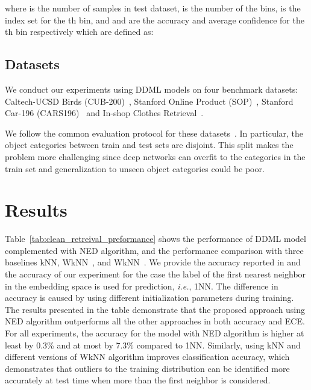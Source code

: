 \documentclass{article}
\newcommand{\ie}{{\it i.e.}}
\begin{document}
where  is the number of samples in test dataset,
 is the number of the bins,
 is the index set for the th bin,
and  and 
are the accuracy and average confidence for the th bin respectively which are defined as:


\subsection{Datasets}
We conduct our experiments using DDML models on four benchmark datasets: Caltech-UCSD Birds (CUB-200)~\cite{b11},  Stanford Online Product (SOP)~\cite{b3}, Stanford Car-196 (CARS196)~\cite{b12} and In-shop Clothes Retrieval~\cite{in-shop}.

We follow the common evaluation protocol for these datasets~\cite{b73}. In particular, the object categories between train and test sets are disjoint. This split makes the problem more challenging since deep networks can overfit to the categories in the train set and generalization to unseen object categories could be poor.

\section{Results}\label{ref:results}

Table~\ref{tab:clean_retreival_preformance} shows the performance of DDML model complemented with NED algorithm, and the performance comparison with three baselines kNN, WkNN~\cite{b70}, and WkNN~\cite{b69}.
We provide the accuracy reported in \cite{b73} and the accuracy of our experiment for the case the label of the first nearest neighbor in the embedding space is used for prediction, \ie, 1NN.
The difference in accuracy is caused by using different initialization parameters during training.
The results presented in the table demonstrate that the proposed approach using NED algorithm outperforms all the other approaches
in both accuracy and ECE.
For all experiments, the accuracy for the model with NED algorithm is higher at least by 0.3\% and at most by 7.3\% compared to 1NN. Similarly, using kNN and different versions of WkNN algorithm improves classification accuracy, which demonstrates that outliers to the training distribution can be identified more accurately at test time when more than the first neighbor is considered.
\end{document}
